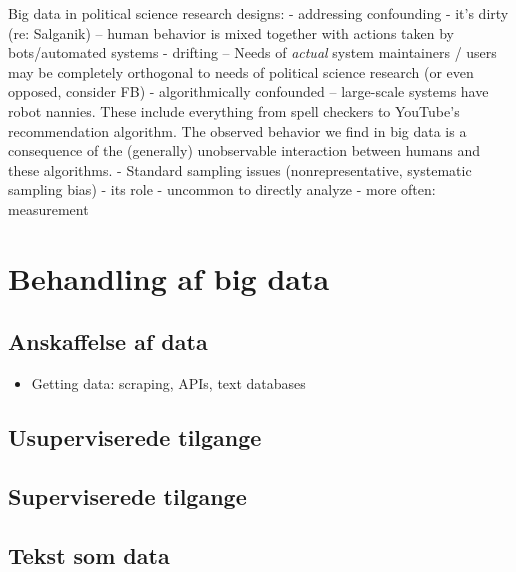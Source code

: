 \documentclass[12pt,]{article}
\providecommand{\tightlist}{%
  \setlength{\itemsep}{0pt}\setlength{\parskip}{0pt}}
\begin{document}
Big data in political science research designs: - addressing confounding
- it's dirty (re: Salganik) -- human behavior is mixed together with
actions taken by bots/automated systems - drifting -- Needs of
\emph{actual} system maintainers / users may be completely orthogonal to
needs of political science research (or even opposed, consider FB) -
algorithmically confounded -- large-scale systems have robot nannies.
These include everything from spell checkers to YouTube's recommendation
algorithm. The observed behavior we find in big data is a consequence of
the (generally) unobservable interaction between humans and these
algorithms. - Standard sampling issues (nonrepresentative, systematic
sampling bias) - its role - uncommon to directly analyze - more often:
measurement

\hypertarget{behandling-af-big-data}{%
\section{Behandling af big data}\label{behandling-af-big-data}}

\hypertarget{anskaffelse-af-data}{%
\subsection{Anskaffelse af data}\label{anskaffelse-af-data}}

\begin{itemize}
\tightlist
\item
  Getting data: scraping, APIs, text databases
\end{itemize}

\hypertarget{usuperviserede-tilgange}{%
\subsection{Usuperviserede tilgange}\label{usuperviserede-tilgange}}

\hypertarget{superviserede-tilgange}{%
\subsection{Superviserede tilgange}\label{superviserede-tilgange}}

\hypertarget{tekst-som-data}{%
\subsection{Tekst som data}\label{tekst-som-data}}
\end{document}
